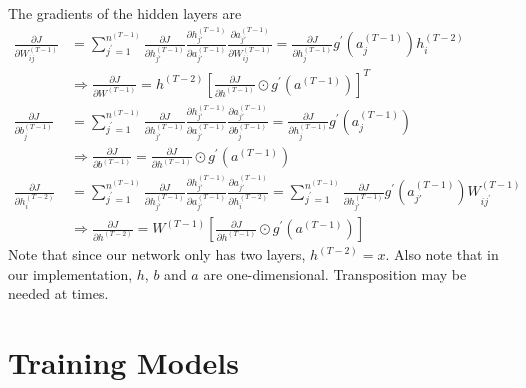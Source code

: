 \documentclass{article} %
\begin{document}
    The gradients of the hidden layers are
    $$
    \begin{aligned}
    \frac{\partial J}{\partial W_{i j}^{\left(T - 1\right)}}&=\sum_{j^{'} = 1}^{n^{\left(T - 1\right)}} \frac{\partial J}{\partial h_{j '}^{\left(T - 1\right)}} \frac{\partial h_{j '}^{\left(T - 1\right)}}{\partial a_{j '}^{\left(T - 1\right)}} \frac{\partial a_{j '}^{\left(T - 1\right)}}{\partial W_{i j}^{\left(T - 1\right)}}=\frac{\partial J}{\partial h_{j}^{\left(T - 1\right)}}g^{'}\left(a_{j}^{\left(T - 1\right)}\right)h_{i}^{\left(T - 2\right)}&\\&\Longrightarrow\frac{\partial J}{\partial W^{\left(T - 1\right)}}=h^{\left(T - 2\right)}\left[\frac{\partial J}{\partial h^{\left(T - 1\right)}} \odot g^{'} \left(a^{\left(T - 1\right)}\right)\right]^{T}\\
    \frac{\partial J}{\partial b_{j}^{\left(T - 1\right)}}&=\sum_{j^{'} = 1}^{n^{\left(T - 1\right)}} \frac{\partial J}{\partial h_{j '}^{\left(T - 1\right)}} \frac{\partial h_{j '}^{\left(T - 1\right)}}{\partial a_{j '}^{\left(T - 1\right)}} \frac{\partial a_{j '}^{\left(T - 1\right)}}{\partial b_{j}^{\left(T - 1\right)}}=\frac{\partial J}{\partial h_{j}^{\left(T - 1\right)}}g^{'}\left(a_{j}^{\left(T - 1\right)}\right)&\\&\Longrightarrow\frac{\partial J}{\partial b^{\left(T - 1\right)}}=\frac{\partial J}{\partial h^{\left(T - 1\right)}}\odot g^{'}\left(a^{\left(T - 1\right)}\right)\\
    \frac{\partial J}{\partial h_{i}^{\left(T - 2\right)}}&=\sum_{j^{'} = 1}^{n^{\left(T - 1\right)}} \frac{\partial J}{\partial h_{j '}^{\left(T - 1\right)}} \frac{\partial h_{j '}^{\left(T - 1\right)}}{\partial a_{j '}^{\left(T - 1\right)}} \frac{\partial a_{j '}^{\left(T - 1\right)}}{\partial h_{i}^{\left(T - 2\right)}}=\sum_{j^{'} = 1}^{n^{\left(T - 1\right)}} \frac{\partial J}{\partial h_{j '}^{\left(T - 1\right)}} g^{'} \left(a_{j '}^{\left(T - 1\right)}\right) W_{i j^{'}}^{\left(T - 1\right)}&\\&\Longrightarrow\frac{\partial J}{\partial h^{\left(T - 2\right)}}=W^{\left(T - 1\right)}\left[\frac{\partial J}{\partial h^{\left(T - 1\right)}} \odot g^{'} \left(a^{\left(T - 1\right)}\right)\right]
    \end{aligned}
    $$
    Note that since our network only has two layers, $h^{(T-2) }=x$.
    Also note that in our implementation, $h$, $b$ and $a$ are one-dimensional. Transposition may be needed at times.

    \section{Training Models}
\end{document}
